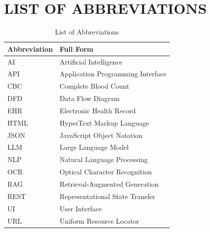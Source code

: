 \chapter*{LIST OF ABBREVIATIONS}

\begin{table}[h]
\centering
\caption{List of Abbreviations}
\begin{tabular}{|l|l|}
    \hline
    \textbf{Abbreviation} & \textbf{Full Form} \\
    \hline
    AI & Artificial Intelligence \\
    API & Application Programming Interface \\
    CBC & Complete Blood Count \\
    DFD & Data Flow Diagram \\
    EHR & Electronic Health Record \\
    HTML & HyperText Markup Language \\
    JSON & JavaScript Object Notation \\
    LLM & Large Language Model \\
    NLP & Natural Language Processing \\
    OCR & Optical Character Recognition \\
    RAG & Retrieval-Augmented Generation \\
    REST & Representational State Transfer \\
    UI & User Interface \\
    URL & Uniform Resource Locator \\
    \hline
\end{tabular}
\end{table}
